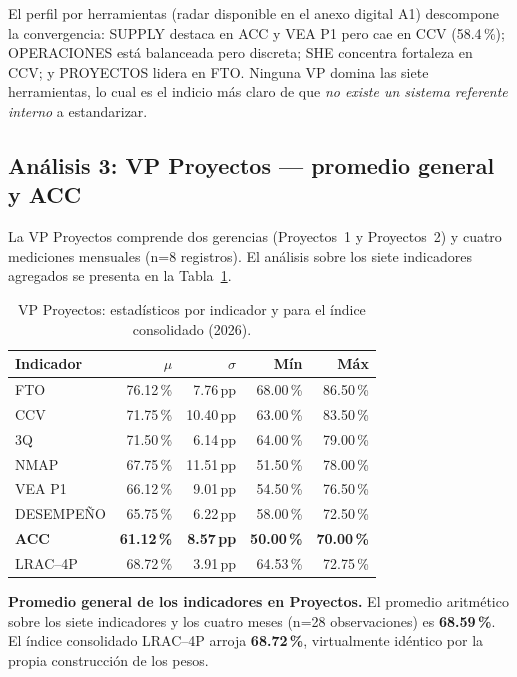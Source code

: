 \documentclass[12pt,a4paper]{article}
\begin{document}
El perfil por herramientas (radar disponible en el anexo digital A1) descompone la convergencia: SUPPLY destaca en ACC y VEA P1 pero cae en CCV (58.4\,\%); OPERACIONES está balanceada pero discreta; SHE concentra fortaleza en CCV; y PROYECTOS lidera en FTO. Ninguna VP domina las siete herramientas, lo cual es el indicio más claro de que \emph{no existe un sistema referente interno} a estandarizar.

\subsection{Análisis 3: VP Proyectos --- promedio general y ACC}

La VP Proyectos comprende dos gerencias (Proyectos~1 y Proyectos~2) y cuatro mediciones mensuales (n=8 registros). El análisis sobre los siete indicadores agregados se presenta en la Tabla~\ref{tab:proyectos}.

\begin{table}[h]
\centering
\small
\begin{tabular}{lrrrr}
\toprule
\textbf{Indicador} & \textbf{$\mu$} & \textbf{$\sigma$} & \textbf{Mín} & \textbf{Máx} \\
\midrule
FTO       & 76.12\,\% & 7.76\,pp & 68.00\,\% & 86.50\,\% \\
CCV       & 71.75\,\% & 10.40\,pp & 63.00\,\% & 83.50\,\% \\
3Q        & 71.50\,\% & 6.14\,pp & 64.00\,\% & 79.00\,\% \\
NMAP      & 67.75\,\% & 11.51\,pp & 51.50\,\% & 78.00\,\% \\
VEA P1    & 66.12\,\% & 9.01\,pp & 54.50\,\% & 76.50\,\% \\
DESEMPEÑO & 65.75\,\% & 6.22\,pp & 58.00\,\% & 72.50\,\% \\
\textbf{ACC} & \textbf{61.12\,\%} & \textbf{8.57\,pp} & \textbf{50.00\,\%} & \textbf{70.00\,\%} \\
\midrule
LRAC--4P & 68.72\,\% & 3.91\,pp & 64.53\,\% & 72.75\,\% \\
\bottomrule
\end{tabular}
\caption{VP Proyectos: estadísticos por indicador y para el índice consolidado (2026).}
\label{tab:proyectos}
\end{table}

\textbf{Promedio general de los indicadores en Proyectos.} El promedio aritmético sobre los siete indicadores y los cuatro meses (n=28 observaciones) es \textbf{68.59\,\%}. El índice consolidado LRAC--4P arroja \textbf{68.72\,\%}, virtualmente idéntico por la propia construcción de los pesos.
\end{document}
